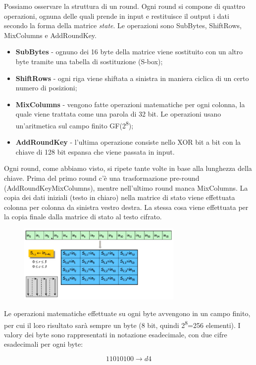 Possiamo osservare la struttura di un round. Ogni round si compone di quattro operazioni, ognuna delle quali prende in input e restituisce il output i dati secondo la forma della matrice \textit{state}. Le operazioni sono SubBytes, ShiftRows, MixColumns e AddRoundKey.
\begin{itemize}
    \item \textbf{SubBytes} - ognuno dei 16 byte della matrice viene sostituito con un altro byte tramite una tabella di sostituzione (S-box);
    \item \textbf{ShiftRows} - ogni riga viene shiftata a sinistra in maniera ciclica di un certo numero di posizioni;
    \item \textbf{MixColumns} - vengono fatte operazioni matematiche per ogni colonna, la quale viene trattata come una parola di 32 bit. Le operazioni usano un'aritmetica sul campo finito GF(2\textsuperscript{8});
    \item \textbf{AddRoundKey} - l'ultima operazione consiste nello XOR bit a bit con la chiave di 128 bit espansa che viene passata in input.
\end{itemize}
Ogni round, come abbiamo visto, si ripete tante volte in base alla lunghezza della chiave. Prima del primo round c'è una trasformazione pre-round (AddRoundKeyMixColumns), mentre nell'ultimo round manca MixColumns. La copia dei dati iniziali (testo in chiaro) nella matrice di stato viene effettuata colonna per colonna da sinistra vestro destra. La stessa cosa viene effettuata per la copia finale dalla matrice di stato al testo cifrato. 

\begin{figure}[htb!]
    \centering
    \includegraphics[width=8cm]{./Images/cap1/1.19.png}
\end{figure} 
  
Le operazioni matematiche effettuate su ogni byte avvengono in un campo finito, per cui il loro risultato sarà sempre un byte (8 bit, quindi 2\textsuperscript{8}=256 elementi). I valory dei byte sono rappresentati in notazione esadecimale, con due cifre esadecimali per ogni byte:

\[ 11010100 \rightarrow d4 \]

